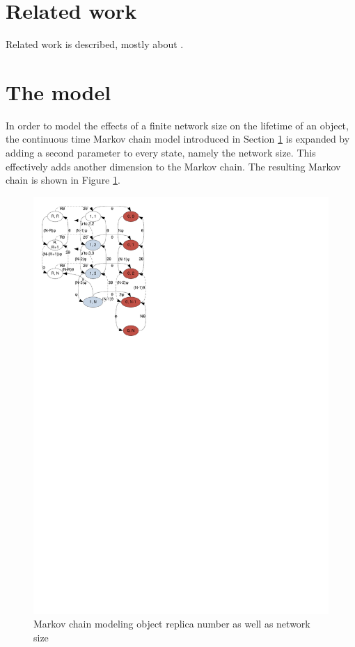 \documentclass[10pt,a4paper,conference]{IEEEtran}
\begin{document}
\section{Related work}
\label{related_work}

Related work is described, mostly about \cite{replication_article}.

\section{The model}
\label{model}

In order to model the effects of a finite network size on the lifetime of an object, the continuous time Markov chain model introduced in Section \ref{related_work} is expanded by adding a second parameter to every state, namely the network size. This effectively adds another dimension to the Markov chain. The resulting Markov chain is shown in Figure \ref{fig_markov_chain}.

\begin{figure}[htbp]
 \centering
 \includegraphics[clip=true, viewport=0.5cm 19.5cm 8.5cm 29.5cm, width=\columnwidth]{Markov_chain_repair_compact}
 \caption{Markov chain modeling object replica number as well as network size}
 \label{fig_markov_chain}
\end{figure}
\end{document}
